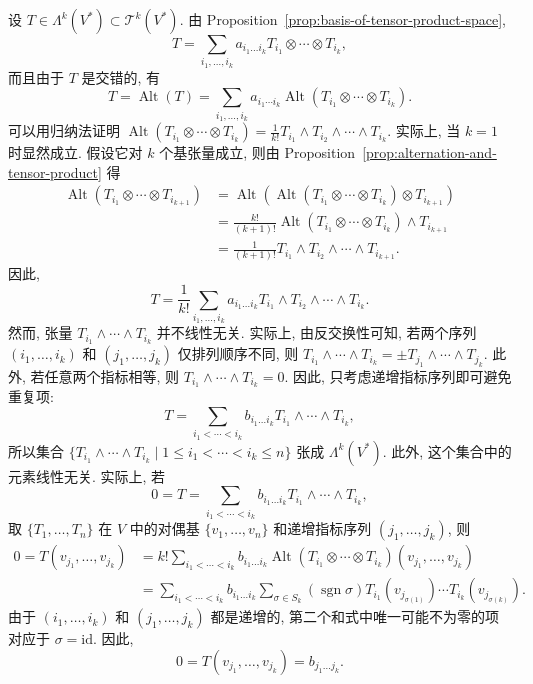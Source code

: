 \begin{RiemannProof}
设 $T\in\Lambda^k(V^*)\subset\mathcal{T}^k(V^*)$. 由 Proposition~\ref{prop:basis-of-tensor-product-space},
\[
  T=\sum_{i_1,\ldots,i_k}a_{i_1\ldots i_k}T_{i_1}\otimes\cdots\otimes T_{i_k},
\]
而且由于 $T$ 是交错的, 有
\[
  T=\operatorname{Alt}(T)=\sum_{i_1,\ldots,i_k}a_{i_1\cdots i_k}
    \operatorname{Alt}(T_{i_1}\otimes\cdots\otimes T_{i_k}).
\]
可以用归纳法证明 $\operatorname{Alt}(T_{i_1}\otimes\cdots\otimes T_{i_k})=\frac{1}{k!}T_{i_1}\wedge T_{i_2}\wedge\cdots\wedge T_{i_k}$. 实际上, 当 $k=1$ 时显然成立. 假设它对 $k$ 个基张量成立, 则由 Proposition~\ref{prop:alternation-and-tensor-product} 得
\begin{align*}
  \operatorname{Alt}(T_{i_1}\otimes\cdots\otimes T_{i_{k+1}})
    &=\operatorname{Alt}(\operatorname{Alt}(T_{i_1}\otimes\cdots\otimes T_{i_k})\otimes T_{i_{k+1}})\\
    &=\frac{k!}{(k+1)!}\operatorname{Alt}(T_{i_1}\otimes\cdots\otimes T_{i_k})\wedge T_{i_{k+1}}\\
    &=\frac{1}{(k+1)!}T_{i_1}\wedge T_{i_2}\wedge\cdots\wedge T_{i_{k+1}}.
\end{align*}
因此,
\[
  T=\frac{1}{k!}\sum_{i_1,\ldots,i_k}a_{i_1\ldots i_k}
     T_{i_1}\wedge T_{i_2}\wedge\cdots\wedge T_{i_k}.
\]
然而, 张量 $T_{i_1}\wedge\cdots\wedge T_{i_k}$ 并不线性无关. 实际上, 由反交换性可知, 若两个序列 $(i_1,\ldots,i_k)$ 和 $(j_1,\ldots,j_k)$ 仅排列顺序不同, 则 $T_{i_1}\wedge\cdots\wedge T_{i_k}=\pm T_{j_1}\wedge\cdots\wedge T_{j_k}$. 此外, 若任意两个指标相等, 则 $T_{i_1}\wedge\cdots\wedge T_{i_k}=0$. 因此, 只考虑递增指标序列即可避免重复项:
\[
  T=\sum_{i_1<\cdots<i_k}b_{i_1\ldots i_k}T_{i_1}\wedge\cdots\wedge T_{i_k},
\]
所以集合 $\{T_{i_1}\wedge\cdots\wedge T_{i_k}\mid 1\leq i_1<\cdots<i_k\leq n\}$ 张成 $\Lambda^k(V^*)$. 此外, 这个集合中的元素线性无关. 实际上, 若
\[
  0=T=\sum_{i_1<\cdots<i_k}b_{i_1\ldots i_k}T_{i_1}\wedge\cdots\wedge T_{i_k},
\]
取 $\{T_1,\ldots,T_n\}$ 在 $V$ 中的对偶基 $\{v_1,\ldots,v_n\}$ 和递增指标序列 $(j_1,\ldots,j_k)$, 则
\begin{align*}
  0=T(v_{j_1},\ldots,v_{j_k})
    &=k!\sum_{i_1<\cdots<i_k}b_{i_1\ldots i_k}
      \operatorname{Alt}(T_{i_1}\otimes\cdots\otimes T_{i_k})(v_{j_1},\ldots,v_{j_k})\\
    &=\sum_{i_1<\cdots<i_k}b_{i_1\ldots i_k}
      \sum_{\sigma\in S_k}(\operatorname{sgn}\sigma)
      T_{i_1}(v_{j_{\sigma(1)}})\cdots T_{i_k}(v_{j_{\sigma(k)}}).
\end{align*}
由于 $(i_1,\ldots,i_k)$ 和 $(j_1,\ldots,j_k)$ 都是递增的, 第二个和式中唯一可能不为零的项对应于 $\sigma=\mathrm{id}$. 因此,
\[
  0=T(v_{j_1},\ldots,v_{j_k})=b_{j_1\ldots j_k}.
\]
\end{RiemannProof}

